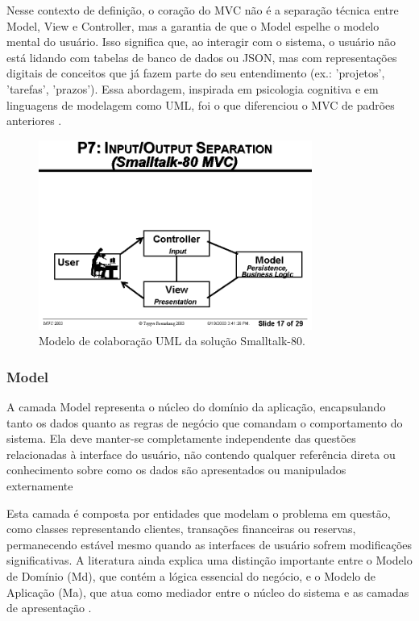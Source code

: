         \par Nesse contexto de definição, o coração do MVC não é a separação técnica entre Model, View e Controller, mas a garantia de que o Model espelhe o modelo mental do usuário. Isso significa que, ao interagir com o sistema, o usuário não está lidando com tabelas de banco de dados ou JSON, mas com representações digitais de conceitos que já fazem parte do seu entendimento (ex.: 'projetos', 'tarefas', 'prazos'). Essa abordagem, inspirada em psicologia cognitiva e em linguagens de modelagem como UML, foi o que diferenciou o MVC de padrões anteriores \cite{artigo:reenskaug:2003}.

        \begin{figure}[H] %
            \centering
            \includegraphics[width=0.8\textwidth]{figuras/figura_mvc_1.png}
            \caption{Modelo de colaboração UML da solução Smalltalk-80.}
            \label{fig:figura_mvc_1}
            \newcommand{\source}{Fonte: \cite{artigo:reenskaug:2003}}
        \end{figure}

        \subsubsection{Model}
            \par A camada Model representa o núcleo do domínio da aplicação, encapsulando tanto os dados quanto as regras de negócio que comandam o comportamento do sistema. Ela deve manter-se completamente independente das questões relacionadas à interface do usuário, não contendo qualquer referência direta ou conhecimento sobre como os dados são apresentados ou manipulados externamente \cite{artigo:deacon:2009}
            
            \par Esta camada é composta por entidades que modelam o problema em questão, como classes representando clientes, transações financeiras ou reservas, permanecendo estável mesmo quando as interfaces de usuário sofrem modificações significativas. A literatura ainda explica uma distinção importante entre o Modelo de Domínio (Md), que contém a lógica essencial do negócio, e o Modelo de Aplicação (Ma), que atua como mediador entre o núcleo do sistema e as camadas de apresentação \cite{artigo:deacon:2009}.
            
